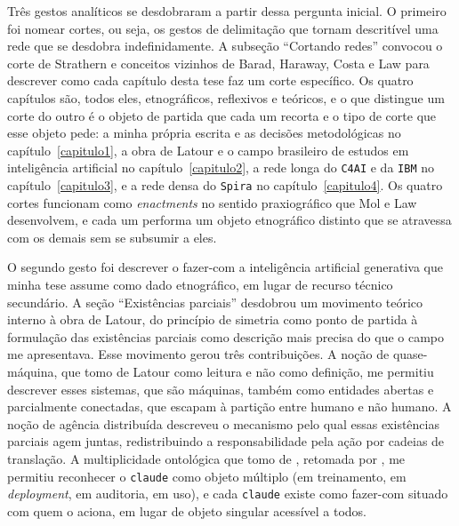 Três gestos analíticos se desdobraram a partir dessa pergunta inicial. O primeiro foi nomear cortes, ou seja, os gestos de delimitação que tornam descritível uma rede que se desdobra indefinidamente.
A subseção \enquote{Cortando redes} convocou o corte de Strathern e conceitos vizinhos de Barad, Haraway, Costa e Law para descrever como cada capítulo desta tese faz um corte específico. Os quatro capítulos são, todos eles, etnográficos, reflexivos e teóricos, e o que distingue um corte do outro é o objeto de partida que cada um recorta e o tipo de corte que esse objeto pede: a minha própria escrita e as decisões metodológicas no capítulo~\ref{capitulo1}, a obra de Latour e o campo brasileiro de estudos em inteligência artificial no capítulo~\ref{capitulo2}, a rede longa do \texttt{C4AI} e da \texttt{IBM} no capítulo~\ref{capitulo3}, e a rede densa do \texttt{Spira} no capítulo~\ref{capitulo4}. Os quatro cortes funcionam como \textit{enactments} no sentido praxiográfico que Mol e Law desenvolvem, e cada um performa um objeto etnográfico distinto que se atravessa com os demais sem se subsumir a eles.

O segundo gesto foi descrever o fazer-com a inteligência artificial generativa que minha tese assume como dado etnográfico, em lugar de recurso técnico secundário. A seção \enquote{Existências parciais} desdobrou um movimento teórico interno à obra de Latour, do princípio de simetria como ponto de partida à formulação das existências parciais como descrição mais precisa do que o campo me apresentava. Esse movimento gerou três contribuições. A noção de quase-máquina, que tomo de Latour como leitura e não como definição, me permitiu descrever esses sistemas, que são máquinas, também como entidades abertas e parcialmente conectadas, que escapam à partição entre humano e não humano. A noção de agência distribuída descreveu o mecanismo pelo qual essas existências parciais agem juntas, redistribuindo a responsabilidade pela ação por cadeias de translação. A multiplicidade ontológica que tomo de \textcite{mol2002body}, retomada por \textcite{Law2004After}, me permitiu reconhecer o \texttt{claude} como objeto múltiplo (em treinamento, em \textit{deployment}, em auditoria, em uso), e cada \texttt{claude} existe como fazer-com situado com quem o aciona, em lugar de objeto singular acessível a todos.

